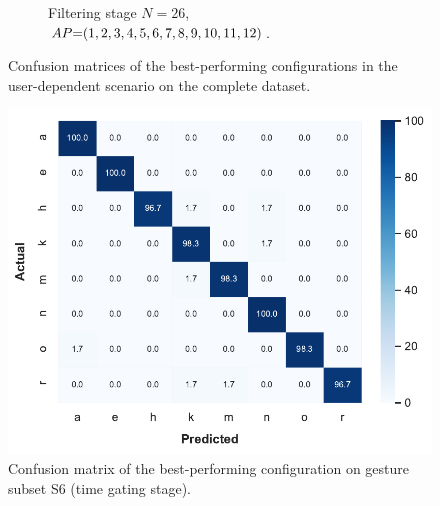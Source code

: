 \begin{figure}
\begin{subfigure}{.69\linewidth}
        \vspace{-12pt}
        \caption{Filtering stage $N{=}26$, \\ $\splitatcommas{AP{=}(1, 2, 3, 4, 5, 6, 7, 8, 9, 10, 11, 12)}$.}
        \label{fig:radar-experiments:confusion-exp1-UD-filtering}
    \end{subfigure}
    \caption{Confusion matrices of the best-performing configurations in the user-dependent scenario on the complete dataset.}
    \label{fig:radar-experiments:confusion-exp1-UD}
    \vspace{-20pt}
\end{figure}

\begin{figure}
    \centering
    \includegraphics[width=.72\linewidth]{Figures/RadarExperiments/Datasets/20Gestures/Results/1_4_7_8_10_14_18_19/1f-cm.pdf}
    \caption{Confusion matrix of the best-performing configuration on gesture subset S6 (time gating stage).}
    \label{fig:confusion-exp2-S6}
    \vspace{-12pt}
\end{figure}


